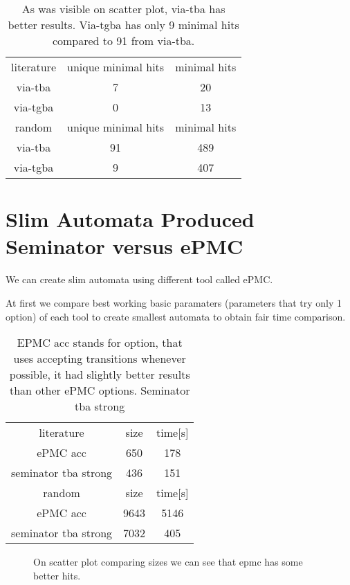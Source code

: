 \documentclass[
	digital
nolof, nolot
]{fithesis3}
\newcommand{\hlineny}{\hline}
\begin{document}
		 
		\begin{table}[ht]
			
			\centering
			\caption{As was visible on scatter plot, via-tba has better results. Via-tgba has only 9 minimal hits compared to 91 from via-tba.}
			\begin{tabular}{ |c||c|c| } 
				\hline
				literature&unique minimal hits&minimal hits\\
				\hhline{|===|}
				via-tba&7 & 20\\
				\hline
				via-tgba&0 & 13\\ 
				\hline
				\hline
				random&unique minimal hits&minimal hits\\
				\hhline{|===|}
				via-tba&91 & 489\\
				\hline
				via-tgba&9 & 407\\ 
				\hline
			\end{tabular}
		\end{table}
	\clearpage
		\section{Slim Automata Produced Seminator versus ePMC}
		We can create slim automata using different tool called ePMC.
		
		At first we compare best working basic paramaters (parameters that try only 1 option) of each tool to create smallest automata to obtain fair time comparison.
	
	\begin{table}[ht]
		\centering
		\caption{EPMC acc stands for option, that uses accepting transitions whenever possible, it had slightly better results than other ePMC options. Seminator tba strong }
		\begin{tabular}{ |c||c|c| } 
			\hline
			literature&size&time[s]\\
			\hhline{|===|}
			ePMC acc&650 &178 \\
			\hline
			seminator tba strong &436 &151 \\
			\hlineny
			\hline
			random&size&time[s]\\
			\hhline{|===|}
			ePMC acc&9643 & 5146\\
			\hline
			seminator tba strong &7032 &405 \\
			\hlineny
		\end{tabular}
	\end{table}
	\begin{figure}[ht]
		\centering
		\caption{On scatter plot comparing sizes we can see that epmc has some better hits.}
		\begin{tikzpicture}
			
		\end{tikzpicture}
	\end{figure}
	
\end{document}
